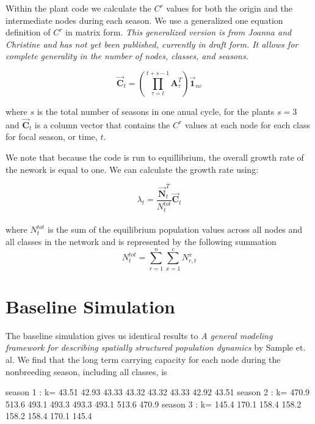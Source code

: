 \documentclass[10pt]{article}
\begin{document}
Within the plant code we calculate the $C^r$ values for both the origin and the intermediate nodes during each season. We use a generalized one equation definition of $C^r$ in matrix form. {\it{This generalized version is from Joanna and Christine and has not yet been published, currently in draft form. It allows for complete generality in the number of nodes, classes, and seasons.}}

\begin{equation}
\vec{\mathbf{C}}_t=\left(\prod_{\tau=t}^{t+s-1}\mathbf{A}_\tau^T\right)\vec{\mathbf{1}}_{nc}
\end{equation}

where $s$ is the total number of seasons in one anual cycle, for the plants $s=3$ and $\vec{\mathbf{C}}_t$ is a column vector that contains the $C^r$ values at each node for each class for focal season, or time, $t$. 

We note that because the code is run to equillibrium, the overall growth rate of the nework is equal to one. We can calculate the growth rate using:

\begin{equation}
\lambda_t= \frac{\vec{\mathbf{N}}_t^T}{N_t^{tot}}\vec{\mathbf{C}}_t
\label{lambda}
\end{equation}\\
where $N_t^{tot}$ is the sum of the equilibrium population values across all nodes and all classes in the network and is represented by the following summation
\begin{equation}
N_t^{tot}=\sum_{r=1}^n\sum_{x=1}^{c}N^x_{r,t}
\end{equation}

\section{Baseline Simulation}
% 
The baseline simulation gives us identical results to {\it{A general modeling framework for describing spatially
structured population dynamics}} by Sample et. al. We find that the long term carrying capacity for each node during the nonbreeding season, including all classes, is

\begin{Schunk}
\begin{Soutput}
season 1 : k= 43.51 42.93 43.33 43.32 43.32 43.33 42.92 43.51
season 2 : k= 470.9 513.6 493.1 493.3 493.3 493.1 513.6 470.9
season 3 : k= 145.4 170.1 158.4 158.2 158.2 158.4 170.1 145.4
\end{Soutput}
\end{Schunk}
\end{document}
